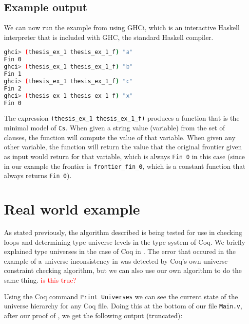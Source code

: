 \subsection{Example output}
\label{sssec:example_output}

We can now run the example from  using GHCi,
which is an interactive Haskell interpreter that is included with GHC, the standard Haskell compiler.

\begin{minipage}{\linewidth}
\begin{lstlisting}[language=bash, label={lst:thm_32_haskell_output}, caption={\lstinline{thm_32} example output}]
ghci> (thesis_ex_1 thesis_ex_1_f) "a"
Fin 0
ghci> (thesis_ex_1 thesis_ex_1_f) "b"
Fin 1
ghci> (thesis_ex_1 thesis_ex_1_f) "c"
Fin 2
ghci> (thesis_ex_1 thesis_ex_1_f) "x"
Fin 0
\end{lstlisting}
\end{minipage}

The expression \lstinline[language=Haskell]{(thesis_ex_1 thesis_ex_1_f)} produces a function that is the minimal model of \lstinline{Cs}.
When given a string value (variable) from the set of clauses, the function will compute the value of that variable.
When given any other variable, the function will return the value that the original frontier given as input
would return for that variable, which is always \lstinline{Fin 0} in this case
(since in our example the frontier is \lstinline{frontier_fin_0},
which is a constant function that always returns \lstinline{Fin 0}).

\section{Real world example}
\label{sec:real_world_example}

As stated previously, the algorithm described  is being
tested for use in checking loops and determining type universe levels in the
type system of Coq.
We briefly explained type universes in the case of Coq in .
The error that occured in the example of a universe inconsistency in 
was detected by Coq's own universe-constraint checking algorithm, but we can also use our own algorithm to do the same thing.
\textcolor{red}{is this true?}

Using the Coq command \lstinline{Print Universes} we can see the current state of the universe hierarchy for any Coq file.
Doing this at the bottom of our file \lstinline{Main.v}, after our proof of ,
we get the following output (truncated):

